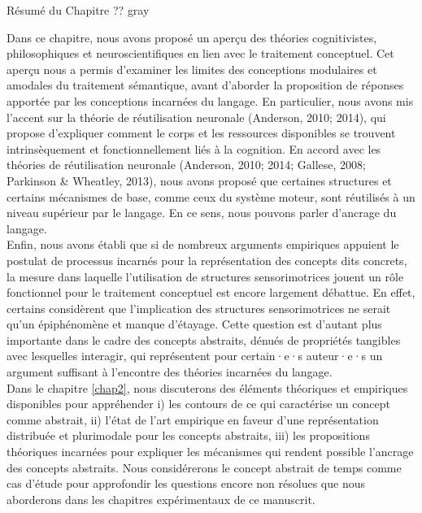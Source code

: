 \documentclass[
  a4paper,12pt,twoside,onecolumn,openright,final,oldfontcommands]{memoir}
\newcommand\chaptercolor{gray}
\newcommand\getcurrentref[1]{
 \ifnumequal{\value{#1}}{0}
  {??}
  {\the\value{#1}}
}
\begin{document}
\begin{vplace}[1]

\begin{summary}{Résumé du Chapitre\getcurrentref{chapter}}{\chaptercolor}

Dans ce chapitre, nous avons proposé un aperçu des théories cognitivistes, philosophiques et neuroscientifiques en lien avec le traitement conceptuel. Cet aperçu nous a permis d’examiner les limites des conceptions modulaires et amodales du traitement sémantique, avant d’aborder la proposition de réponses apportée par les conceptions incarnées du langage. En particulier, nous avons mis l’accent sur la théorie de réutilisation neuronale (Anderson, 2010; 2014), qui propose d’expliquer comment le corps et les ressources disponibles se trouvent intrinsèquement et fonctionnellement liés à la cognition. En accord avec les théories de réutilisation neuronale (Anderson, 2010; 2014; Gallese, 2008; Parkinson \& Wheatley, 2013), nous avons proposé que certaines structures et certains mécanismes de base, comme ceux du système moteur, sont réutilisés à un niveau supérieur par le langage. En ce sens, nous pouvons parler d'ancrage du langage.\\

Enfin, nous avons établi que si de nombreux arguments empiriques appuient le postulat de processus incarnés pour la représentation des concepts dits concrets, la mesure dans laquelle l’utilisation de structures sensorimotrices jouent un rôle fonctionnel pour le traitement conceptuel est encore largement débattue. En effet, certains considèrent que l’implication des structures sensorimotrices ne serait qu’un épiphénomène et manque d’étayage. Cette question est d’autant plus importante dans le cadre des concepts abstraits, dénués de propriétés tangibles avec lesquelles interagir, qui représentent pour certain·e·s auteur·e·s un argument suffisant à l’encontre des théories incarnées du langage.\\

Dans le chapitre \ref{chap2}, nous discuterons des éléments théoriques et empiriques disponibles pour appréhender i) les contours de ce qui caractérise un concept comme abstrait, ii) l’état de l’art empirique en faveur d’une représentation distribuée et plurimodale pour les concepts abstraits, iii) les propositions théoriques incarnées pour expliquer les mécanismes qui rendent possible l’ancrage des concepts abstraits. Nous considérerons le concept abstrait de temps comme cas d’étude pour approfondir les questions encore non résolues que nous aborderons dans les chapitres expérimentaux de ce manuscrit.

\end{summary}

\end{vplace}
\end{document}
